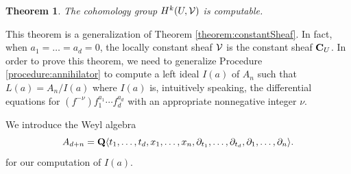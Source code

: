\documentclass[12pt]{article}
\def\pd#1{ \partial_{#1} }
\def\C{{\bf C}}
\def\Q{{\bf Q}}
\newtheorem{theorem}{Theorem}[section]
\begin{document}
\begin{theorem}  \label{theorem:locallyConstantSheaf}
The cohomology group
$H^k(U,{\cal V})$ is computable.
\end{theorem}

This theorem is a generalization of Theorem \ref{theorem:constantSheaf}.
In fact, when $a_1 = \ldots = a_d = 0$,
the locally constant sheaf ${\cal V}$ is the constant sheaf $\C_U$.
In order to prove this theorem, we need to generalize Procedure
\ref{procedure:annihilator}
to compute a left ideal $I(a)$ of $A_n$ 
such that
$ L(a) = A_n/I(a)$
where $I(a)$ is, intuitively speaking,
the differential equations for
$(f^{-\nu})f_1^{a_1} \cdots f_d^{a_d}$ with an appropriate nonnegative
integer $\nu$.

We introduce the Weyl algebra
$$A_{d+n} = \Q\langle t_1, \ldots, t_d, x_1, \ldots, x_n,
  \pd{t_1}, \ldots, \pd{t_d}, \pd{1}, \ldots, \pd{n} \rangle.
$$
for our computation of $I(a)$.
\end{document}
